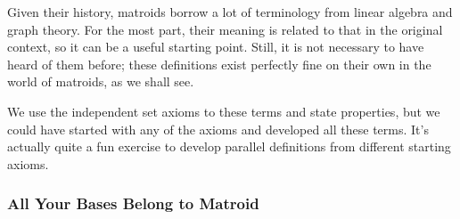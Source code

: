 \documentclass[12pt,oneside]{../../sfsuthesis}
\begin{document}
Given their history, matroids borrow a lot of terminology from linear algebra and graph theory.
For the most part, their meaning is related to that in the original context, so it can be a useful starting point.
Still, it is not necessary to have heard of them before;
these definitions exist perfectly fine on their own in the world of matroids, as we shall see.

We use the independent set axioms to these terms and state properties, but we could have started with any of the axioms and developed all these terms.
It's actually quite a fun exercise to develop parallel definitions from different starting axioms.

\subsubsection{All Your Bases Belong to Matroid}
\end{document}
